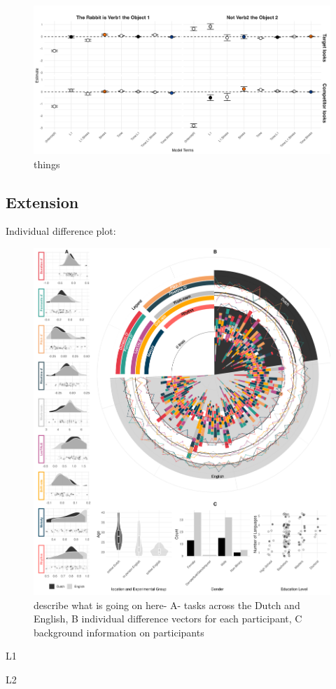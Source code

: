 \begin{figure}[p]  %
    \centering
    \includegraphics[width=\textwidth,height=\textheight,keepaspectratio]{viz/gam_mod_out.png}
    \caption{things}
    \label{fig:gam_mod_out}
\end{figure}

\subsection{Extension}

Individual difference plot:
\clearpage
\begin{figure}[p]  %
    \centering
    \includegraphics[width=\textwidth,height=\textheight,keepaspectratio]{viz/combined_plot_circle.png}
    \caption{describe what is going on here- A- tasks across the Dutch and English, B individual difference vectors for each participant, C background information on participants}
    \label{fig:combined_plot}
\end{figure}
\clearpage

L1 

L2


